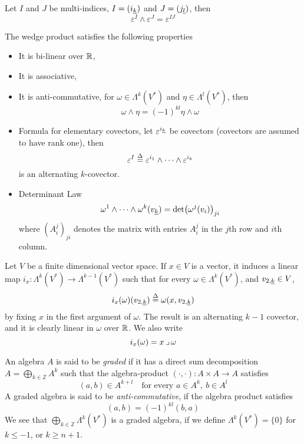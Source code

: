 \documentclass[../main-manifolds.tex]{subfiles}
\begin{document}
\begin{wts}[Lemma 14.10]
    Let $I$ and $J$ be multi-indices, $I = (\Ul{i}[k])$ and $J = (\Ul{j}[l])$, then
    \begin{equation}
        \varepsilon^I\wedge\varepsilon^J = \varepsilon^{IJ}
    \end{equation}
\end{wts}

\begin{wts}\label{lee-chp14:lemma14.11}
    The wedge product satisfies the following properties
    \begin{itemize}
        \item It is bi-linear over $\mathbb{R}$,
        \item It is associative,
        \item It is anti-commutative, for $\omega\in\Lambda^k(V^*)$ and $\eta\in\Lambda^l(V^*)$, then
        \[
            \omega\wedge\eta = (-1)^{kl}\eta\wedge\omega
        \]
        \item Formula for elementary covectors, let $\varepsilon^{\Ul{i}[k]}$ be covectors (covectors are assumed to have rank one), then
        \[
        \varepsilon^I\overset{\Delta}{=} \varepsilon^{i_1}\wedge\cdots\wedge \varepsilon^{i_k}
        \]
        is an alternating $k$-covector.
        \item Determinant Law
        \[
            \omega^1\wedge\cdots\wedge \omega^k(\Ul{v}[k]) = \det(\omega^j(v_i))_{ji}
        \]
        where $(A^j_i)_{ji}$ denotes the matrix with entries $A^j_i$ in the $j$th row and $i$th column.
    \end{itemize}
\end{wts}

\begin{definition}
    Let $V$ be a finite dimensional vector space.  If $x\in V$ is a vector, it induces a linear map $i_x: \Lambda^k(V^*)\to \Lambda^{k-1}(V^*)$ such that for every $\omega\in \Lambda^k(V^*)$, and $\Ul{v}[2][k]\in V$, 
    \[
        i_x(\omega)(\Ul{v}[2][k]) \defined \omega(x,\Ul{v}[2][k])
    \]
    by fixing $x$ in the first argument of $\omega$. The result is an alternating $k-1$ covector, and it is clearly linear in $\omega$ over $\mathbb{R}$. We also write
    \[
        i_x(\omega) = x\mathop{\lrcorner} \omega
    \]
\end{definition}


\begin{definition}
    An algebra $A$ is said to be \emph{graded} if it has a direct sum decomposition $A = \bigoplus_{k\in \mathbb{Z}}A^k$ such that the algebra-product $(\cdot,\cdot): A\times A\to A$ satisfies 
    \[
        (a,b)\in A^{k+l}\quad\text{for every }a\in A^k,\: b\in A^l
    \]
    A graded algebra is said to be \emph{anti-commutative}, if the algebra product satisfies
    \[
        (a,b) = (-1)^{kl}(b,a)
    \]
    We see that $\bigoplus_{k\in \mathbb{Z}}\Lambda^k(V^*)$ is a graded algebra, if we define $\Lambda^k(V^*)=\{0\}$ for $k\leq -1$, or $k\geq n+1$. 

\end{definition}
\end{document}
